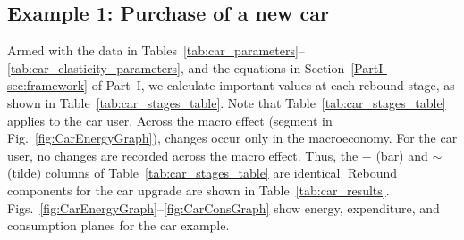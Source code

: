 \documentclass[12pt]{article}\usepackage[]{graphicx}\usepackage[]{xcolor}
\begin{document}
\subsection{Example 1: Purchase of a new car}
\label{sec:car_example}

Armed with the data in
Tables~\ref{tab:car_parameters}--\ref{tab:car_elasticity_parameters},
and the equations in Section~\ref{PartI-sec:framework} of Part~I,
we calculate important values at each rebound stage,
as shown in Table~\ref{tab:car_stages_table}.
Note that Table~\ref{tab:car_stages_table} applies to the car user.
Across the macro effect (segment \bartilde{} in Fig.~\ref{fig:CarEnergyGraph}),
changes occur only in the macroeconomy.
For the car user, no changes are recorded across the macro effect.
Thus, the $-$ (bar) and $\sim$ (tilde) columns
of Table~\ref{tab:car_stages_table} are identical.
Rebound components for the car upgrade are shown in Table~\ref{tab:car_results}.
Figs.~\ref{fig:CarEnergyGraph}--\ref{fig:CarConsGraph}
show energy, expenditure, and consumption planes
for the car example.
\end{document}
